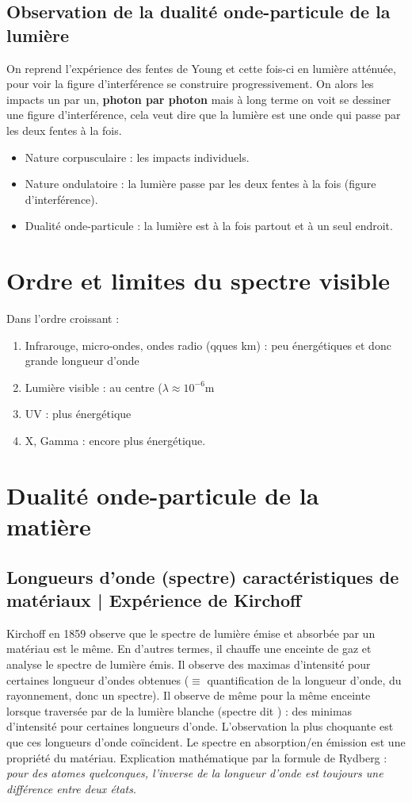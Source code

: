 \documentclass[11pt]{book}
\begin{document}
\subsection{Observation de la dualité onde-particule de la lumière}
On reprend l'expérience des fentes de Young et cette fois-ci en lumière atténuée, pour voir la figure d'interférence se construire progressivement. On alors les impacts un par un, \textbf{photon par photon} mais à long terme on voit se dessiner une figure d'interférence, cela veut dire que la lumière est une onde qui passe par les deux fentes à la fois.

\begin{itemize}
\item Nature corpusculaire : les impacts individuels.
\item Nature ondulatoire : la lumière passe par les deux fentes à la fois (figure d'interférence).
\item Dualité onde-particule : la lumière est à la fois partout et à un seul endroit. \end{itemize}
\section{Ordre et limites du spectre visible}
Dans l'ordre croissant :
\begin{enumerate}
\item Infrarouge, micro-ondes, ondes radio (qques km) : peu énergétiques et donc grande longueur d'onde
\item Lumière visible : au centre ($\lambda\approx 10^{-6}$m
\item UV : plus énergétique
\item X, Gamma : encore plus énergétique.
\end{enumerate}
\section{Dualité onde-particule de la matière}
\subsection{Longueurs d'onde (spectre) caractéristiques de matériaux | Expérience de Kirchoff}
Kirchoff en 1859 observe que le spectre de lumière émise et absorbée par un matériau est le même. En d'autres termes, il chauffe une enceinte de gaz et analyse le spectre de lumière émis. Il observe des maximas d'intensité pour certaines longueur d'ondes obtenues ($\equiv$ quantification de la longueur d'onde, du rayonnement, donc un spectre). Il observe de même pour la même enceinte lorsque traversée par de la lumière blanche (spectre dit ) : des minimas d'intensité pour certaines longueurs d'onde. L'observation la plus choquante est que ces longueurs d'onde coïncident. Le spectre en absorption/en émission est une propriété du matériau. Explication mathématique par la formule de Rydberg : \textit{pour des atomes quelconques, l'inverse de la longueur d'onde est toujours une différence entre deux états}.
\end{document}

